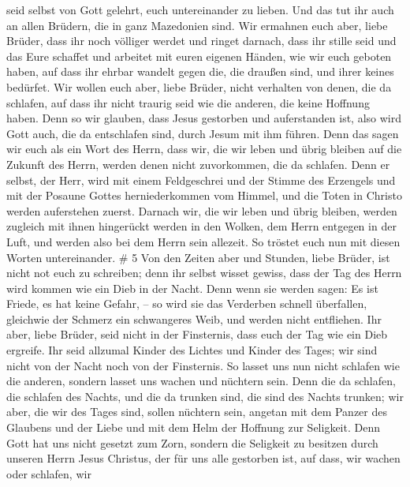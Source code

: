 seid selbst von Gott gelehrt, euch untereinander zu lieben.
 Und das tut ihr auch an allen Brüdern, die in ganz
Mazedonien sind. Wir ermahnen euch aber, liebe Brüder, dass ihr noch
völliger werdet  und ringet darnach, dass ihr stille seid
und das Eure schaffet und arbeitet mit euren eigenen Händen, wie wir
euch geboten haben,  auf dass ihr ehrbar wandelt gegen die,
die draußen sind, und ihrer keines bedürfet.  Wir wollen
euch aber, liebe Brüder, nicht verhalten von denen, die da schlafen, auf
dass ihr nicht traurig seid wie die anderen, die keine Hoffnung haben.
 Denn so wir glauben, dass Jesus gestorben und auferstanden
ist, also wird Gott auch, die da entschlafen sind, durch Jesum mit ihm
führen.  Denn das sagen wir euch als ein Wort des Herrn,
dass wir, die wir leben und übrig bleiben auf die Zukunft des Herrn,
werden denen nicht zuvorkommen, die da schlafen.  Denn er
selbst, der Herr, wird mit einem Feldgeschrei und der Stimme des
Erzengels und mit der Posaune Gottes herniederkommen vom Himmel, und die
Toten in Christo werden auferstehen zuerst.  Darnach wir,
die wir leben und übrig bleiben, werden zugleich mit ihnen hingerückt
werden in den Wolken, dem Herrn entgegen in der Luft, und werden also
bei dem Herrn sein allezeit.  So tröstet euch nun mit
diesen Worten untereinander. \# 5  Von den Zeiten aber und
Stunden, liebe Brüder, ist nicht not euch zu schreiben; 
denn ihr selbst wisset gewiss, dass der Tag des Herrn wird kommen wie
ein Dieb in der Nacht.  Denn wenn sie werden sagen: Es ist
Friede, es hat keine Gefahr, -- so wird sie das Verderben schnell
überfallen, gleichwie der Schmerz ein schwangeres Weib, und werden nicht
entfliehen.  Ihr aber, liebe Brüder, seid nicht in der
Finsternis, dass euch der Tag wie ein Dieb ergreife.  Ihr
seid allzumal Kinder des Lichtes und Kinder des Tages; wir sind nicht
von der Nacht noch von der Finsternis.  So lasset uns nun
nicht schlafen wie die anderen, sondern lasset uns wachen und nüchtern
sein.  Denn die da schlafen, die schlafen des Nachts, und
die da trunken sind, die sind des Nachts trunken;  wir aber,
die wir des Tages sind, sollen nüchtern sein, angetan mit dem Panzer des
Glaubens und der Liebe und mit dem Helm der Hoffnung zur Seligkeit.
 Denn Gott hat uns nicht gesetzt zum Zorn, sondern die
Seligkeit zu besitzen durch unseren Herrn Jesus Christus, 
der für uns alle gestorben ist, auf dass, wir wachen oder schlafen, wir
